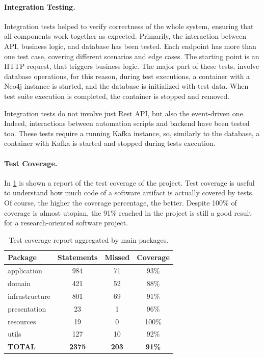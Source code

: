 \documentclass[12pt,a4paper,openright,twoside]{book}
\begin{document}
\paragraph{Integration Testing.}

Integration tests helped to verify correctness of the whole system, ensuring that all components work together as expected.
%
Primarily, the interaction between API, business logic, and database has been tested.
%
Each endpoint has more than one test case, covering different scenarios and edge cases.
%
The starting point is an HTTP request, that triggers business logic.
%
The major part of these tests, involve database operations, for this reason, during test executions, a container with a Neo4j instance is started, and the database is initialized with test data.
%
When test suite execution is completed, the container is stopped and removed.

Integration tests do not involve just Rest API, but also the event-driven one.
%
Indeed, interactions between automation scripts and backend have been tested too.
%
These tests require a running Kafka instance, so, similarly to the database, a container with Kafka is started and stopped during tests execution.

\paragraph{Test Coverage.}

In \cref{tab:coverage} is shown a report of the test coverage of the project.
%
Test coverage is useful to understand how much code of a software artifact is actually covered by tests.
%
Of course, the higher the coverage percentage, the better.
%
Despite 100\% of coverage is almost utopian, the 91\% reached in the project is still a good result for a research-oriented software project.

\begin{table}
    \centering
    \begin{tabular}{lccc}
        \toprule
        \textbf{Package} & \textbf{Statements} & \textbf{Missed} & \textbf{Coverage} \\
        \midrule
        application   & 984  & 71  & 93\% \\
        domain        & 421  & 52  & 88\% \\
        infrastructure & 801  & 69  & 91\% \\
        presentation  & 23  & 1   & 96\% \\
        resources    & 19  & 0   & 100\% \\
        utils        & 127 & 10 &  92\% \\ 
        \midrule
        \textbf{TOTAL} & \textbf{2375} & \textbf{203} & \textbf{91\%} \\
        \bottomrule
    \end{tabular}
    \caption{Test coverage report aggregated by main packages.}
    \label{tab:coverage}
\end{table}
\end{document}
